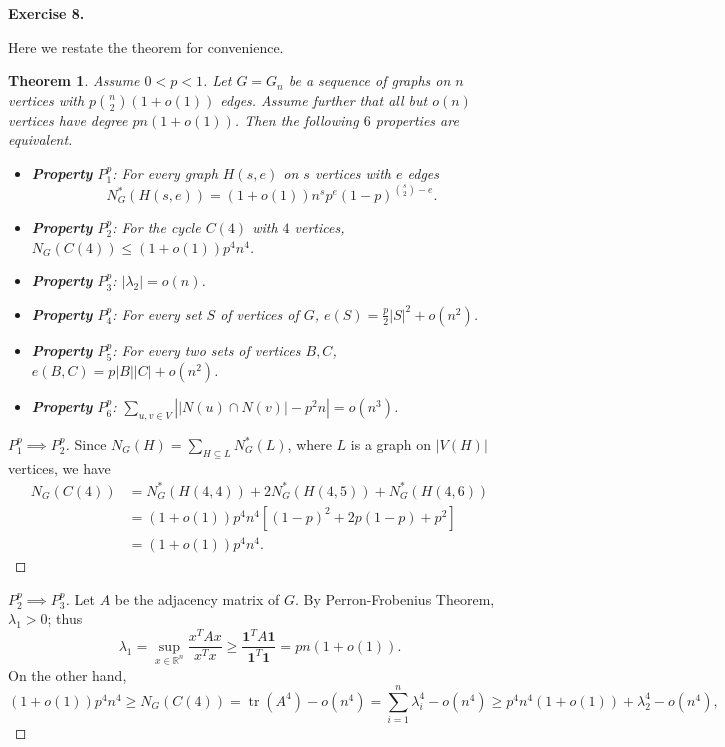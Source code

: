 \documentclass[a4paper]{article}
\newtheorem{theorem}{Theorem}
\newtheorem*{proof}{Proof}
\newenvironment{exercise}[1]{
	\par
	\noindent\textbf{Exercise #1.}\quad
}{
	\par
	\bigskip
}
\DeclareMathOperator{\tr}{\mathrm{tr}}
\newcommand{\abs}[1]{\left| #1 \right|}
\newcommand{\pbra}[1]{\left( #1 \right)}
\newcommand{\sbra}[1]{\left[ #1 \right]}
\newcommand{\Rbb}{\mathbb{R}}
\begin{document}
\begin{exercise}{8}
    Here we restate the theorem for convenience.
    \begin{theorem}
        Assume $0<p<1$. Let $G=G_n$ be a sequence of graphs on $n$ vertices with $p\binom n2(1+o(1))$ edges. 
        Assume further that all but $o(n)$ vertices have degree $pn(1+o(1))$. Then the following $6$ properties are 
        equivalent.
        \begin{itemize}
            \item \textbf{Property} $P^p_1$: For every graph $H(s,e)$ on $s$ vertices with $e$ edges
                $$
                N_G^*(H(s,e))=(1+o(1))n^sp^e(1-p)^{\binom s2-e}.
                $$
            \item \textbf{Property} $P^p_2$: For the cycle $C(4)$ with $4$ vertices, $N_G(C(4))\leq(1+o(1))p^4n^4$. 
            \item \textbf{Property} $P^p_3$: $\abs{\lambda_2}=o(n)$.
            \item \textbf{Property} $P^p_4$: For every set $S$ of vertices of $G$, $e(S)=\frac p2|S|^2+o(n^2)$.
            \item \textbf{Property} $P^p_5$: For every two sets of vertices $B,C$, $e(B,C)=p|B||C|+o(n^2)$.
            \item \textbf{Property} $P^p_6$: $\sum_{u,v\in V}\abs{|N(u)\cap N(v)|-p^2n}=o(n^3)$.
        \end{itemize}
    \end{theorem}
    \begin{proof}[$P_1^p\implies P^p_2$]
        Since $N_G(H)=\sum_{H\subseteq L}N_G^*(L)$, where $L$ is a graph on $|V(H)|$ vertices,
        we have
        \begin{align*}
            N_G(C(4))&=N_G^*(H(4,4))+2N_G^*(H(4,5))+N_G^*(H(4,6))\\
            &=(1+o(1))p^4n^4\sbra{(1-p)^2+2p(1-p)+p^2}\\
            &=(1+o(1))p^4n^4.
        \end{align*}
    \end{proof}
    \begin{proof}[$P_2^p\implies P^p_3$]
        Let $A$ be the adjacency matrix of $G$.
        By Perron-Frobenius Theorem, $\lambda_1>0$; thus
        $$
        \lambda_1=\sup_{x\in\Rbb^n}\frac{x^TAx}{x^Tx}\geq\frac{\bm 1^TA\bm 1}{\bm 1^T\bm 1}=pn(1+o(1)).
        $$
        On the other hand,
        $$
        (1+o(1))p^4n^4\geq N_G(C(4))=\tr\pbra{A^4}-o(n^4)=\sum_{i=1}^n\lambda_i^4-o(n^4)\geq p^4n^4(1+o(1))+\lambda_2^4-o(n^4),
$$
\end{proof}
\end{exercise}
\end{document}
